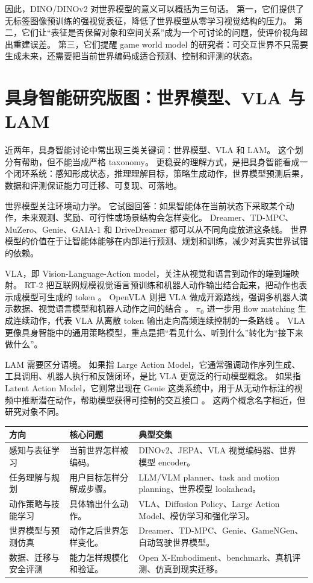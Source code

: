 \documentclass[11pt,a4paper]{ctexart}
\begin{document}
因此，DINO/DINOv2 对世界模型的意义可以概括为三句话。
第一，它们提供了无标签图像预训练的强视觉表征，降低了世界模型从零学习视觉结构的压力。
第二，它们让“表征是否保留对象和空间关系”成为一个可讨论的问题，使评价视角超出重建误差。
第三，它们提醒 game world model 的研究者：可交互世界不只需要生成未来，还需要把当前世界编码成适合预测、控制和评测的状态。

\section{具身智能研究版图：世界模型、VLA 与 LAM}

近两年，具身智能讨论中常出现三类关键词：世界模型、VLA 和 LAM。
这个划分有帮助，但不能当成严格 taxonomy。
更稳妥的理解方式，是把具身智能看成一个闭环系统：感知形成状态，推理理解目标，策略生成动作，世界模型预测后果，数据和评测保证能力可迁移、可复现、可落地。

世界模型关注环境动力学。
它试图回答：如果智能体在当前状态下采取某个动作，未来观测、奖励、可行性或场景结构会怎样变化。
Dreamer、TD-MPC、MuZero、Genie、GAIA-1 和 DriveDreamer 都可以从不同角度放进这条线。
世界模型的价值在于让智能体能够在内部进行预测、规划和训练，减少对真实世界试错的依赖。

VLA，即 Vision-Language-Action model，关注从视觉和语言到动作的端到端映射。
RT-2 把互联网规模视觉语言预训练和机器人动作输出结合起来，把动作也表示成模型可生成的 token \cite{brohan2023rt2}。
OpenVLA 则把 VLA 做成开源路线，强调多机器人演示数据、视觉语言模型和机器人动作之间的结合 \cite{kim2024openvla}。
$\pi_0$ 进一步用 flow matching 生成连续动作，代表 VLA 从离散 token 输出走向高频连续控制的一条路线 \cite{black2024pi0}。
VLA 更像具身智能中的通用策略模型，重点是把“看见什么、听到什么”转化为“接下来做什么”。

LAM 需要区分语境。
如果指 Large Action Model，它通常强调动作序列生成、工具调用、机器人执行和反馈闭环，是比 VLA 更宽泛的行动模型概念。
如果指 Latent Action Model，它则常出现在 Genie 这类系统中，用于从无动作标注的视频中推断潜在动作，帮助模型获得可控制的交互接口 \cite{bruce2024genie}。
这两个概念名字相近，但研究对象不同。

\begin{longtable}{p{} p{} p{}}
\toprule
方向 & 核心问题 & 典型交集 \\
\midrule
感知与表征学习 & 当前世界怎样被编码。 & DINOv2、JEPA、VLA 视觉编码器、世界模型 encoder。 \\
任务理解与规划 & 用户目标怎样分解成步骤。 & LLM/VLM planner、task and motion planning、世界模型 lookahead。 \\
动作策略与技能学习 & 具体输出什么动作。 & VLA、Diffusion Policy、Large Action Model、模仿学习和强化学习。 \\
世界模型与预测仿真 & 动作之后世界怎样变化。 & Dreamer、TD-MPC、Genie、GameNGen、自动驾驶世界模型。 \\
数据、迁移与安全评测 & 能力怎样规模化和验证。 & Open X-Embodiment、benchmark、真机评测、仿真到现实迁移。 \\
\bottomrule
\end{longtable}
\end{document}
